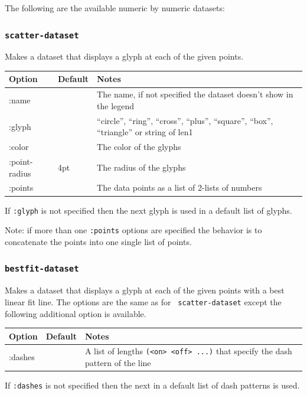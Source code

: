 \documentclass{article}
\begin{document}
The following are the available numeric by numeric datasets:

\subsubsection{\tt scatter-dataset}

Makes a dataset that displays a glyph at each of the given points.

\begin{center}
\begin{tabular}{lll}
Option & Default & Notes \\
\hline
:name & & The name, if not specified the dataset doesn't show in
the legend\\
:glyph & & ``circle'', ``ring'', ``cross'', ``plus'', ``square'',
``box'', ``triangle'' or string of len1\\
:color & & The color of the glyphs\\
:point-radius & 4pt & The radius of the glyphs\\
:points & & The data points as a list of 2-lists of numbers\\
\end{tabular}
\end{center}

If {\tt :glyph} is not specified then the next glyph is used in a
default list of glyphs.

Note: if more than one {\tt :points} options are specified the
behavior is to concatenate the points into one single list of points.

\subsubsection{\tt bestfit-dataset}

Makes a dataset that displays a glyph at each of the given points with
a best linear fit line.  The options are the same as for {\tt
  scatter-dataset} except the following additional option is
available.

\begin{center}
\begin{tabular}{lll}
Option & Default & Notes \\
\hline
:dashes & & A list of lengths {\tt (<on> <off> ...)} that specify the
dash pattern of the line\\
\end{tabular}
\end{center}

If {\tt :dashes} is not specified then the next in a default list of
dash patterns is used.
\end{document}
